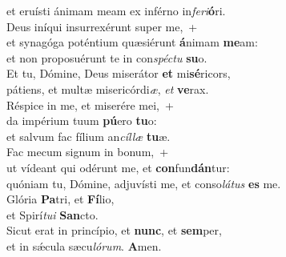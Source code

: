 \evenverse et eruísti ánimam meam ex inférno in\textit{fe}\textit{ri}\textbf{ó}ri.\\
\oddverse Deus iníqui insurrexérunt super me,~+\\
\oddverse  et synagóga poténtium quæsiérunt \textbf{á}nimam \textbf{me}am:~\*\\
\oddverse et non proposuérunt te in con\textit{spé}\textit{ctu} \textbf{su}o.\\
\evenverse Et tu, Dómine, Deus miserátor \textbf{et} mi\textbf{sé}ricors,~\*\\
\evenverse pátiens, et multæ misericórdi\textit{æ}, \textit{et} \textbf{ve}rax.\\
\oddverse Réspice in me, et miserére mei,~+\\
\oddverse  da impérium tuum \textbf{pú}ero \textbf{tu}o:~\*\\
\oddverse et salvum fac fílium an\textit{cíl}\textit{læ} \textbf{tu}æ.\\
\evenverse Fac mecum signum in bonum,~+\\
\evenverse  ut vídeant qui odérunt me, et \textbf{con}fun\textbf{dán}tur:~\*\\
\evenverse quóniam tu, Dómine, adjuvísti me, et conso\textit{lá}\textit{tus} \textbf{es} me.\\
\oddverse Glória \textbf{Pa}tri, et \textbf{Fí}lio,~\*\\
\oddverse et Spirí\textit{tu}\textit{i} \textbf{San}cto.\\
\evenverse Sicut erat in princípio, et \textbf{nunc}, et \textbf{sem}per,~\*\\
\evenverse et in sǽcula sæcu\textit{ló}\textit{rum}. \textbf{A}men.\\
